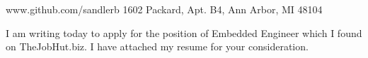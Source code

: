 \documentclass{cover_letter}
\begin{document}


            {www.github.com/sandlerb}
            {1602 Packard, Apt. B4, Ann Arbor, MI 48104}

\dividingline{}




\par I am writing today to apply for the position of Embedded Engineer which I
found on TheJobHut.biz.  I have attached my resume for your consideration.
\end{document}
